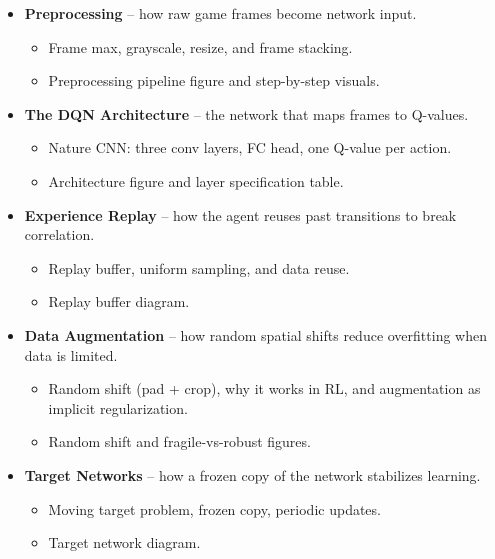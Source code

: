 \documentclass[11pt]{article}
\begin{document}
\begin{itemize}
\item \textbf{Preprocessing} -- how raw game frames become network
  input.
  \begin{itemize}[label=$\circ$, itemsep=0.2em, parsep=0pt, topsep=0pt, partopsep=0pt]
  \item Frame max, grayscale, resize, and frame stacking.
  \item Preprocessing pipeline figure and step-by-step visuals.
  \end{itemize}
\item \textbf{The DQN Architecture} -- the network that maps
  frames to Q-values.
  \begin{itemize}[label=$\circ$, itemsep=0.2em, parsep=0pt, topsep=0pt, partopsep=0pt]
  \item Nature CNN: three conv layers, FC head, one Q-value per
    action.
  \item Architecture figure and layer specification table.
  \end{itemize}
\item \textbf{Experience Replay} -- how the agent reuses past
  transitions to break correlation.
  \begin{itemize}[label=$\circ$, itemsep=0.2em, parsep=0pt, topsep=0pt, partopsep=0pt]
  \item Replay buffer, uniform sampling, and data reuse.
  \item Replay buffer diagram.
  \end{itemize}
\item \textbf{Data Augmentation} -- how random spatial shifts
  reduce overfitting when data is limited.
  \begin{itemize}[label=$\circ$, itemsep=0.2em, parsep=0pt, topsep=0pt, partopsep=0pt]
  \item Random shift (pad + crop), why it works in RL, and
    augmentation as implicit regularization.
  \item Random shift and fragile-vs-robust figures.
  \end{itemize}
\item \textbf{Target Networks} -- how a frozen copy of the network
  stabilizes learning.
  \begin{itemize}[label=$\circ$, itemsep=0.2em, parsep=0pt, topsep=0pt, partopsep=0pt]
  \item Moving target problem, frozen copy, periodic updates.
  \item Target network diagram.
  \end{itemize}

\end{itemize}
\end{document}
